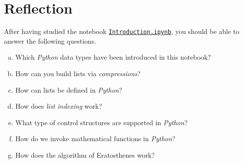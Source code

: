 \section{Reflection}
After having studied the notebook
\href{https://github.com/karlstroetmann/Algorithms}{\texttt{Introduction.ipynb}}, you should be able to answer the following questions.
\begin{enumerate}[(a)]
\item Which \textsl{Python} data types have been introduced in this notebook?
\item How can you build lists via \emph{compressions}? 
\item How can lists be defined in \textsl{Python}?
\item How does \emph{list indexing} work?
\item What type of control structures are supported in \textsl{Python}?
\item How do we invoke mathematical functions in \textsl{Python}?
\item How does the algorithm of Eratosthenes work?  
\end{enumerate}



